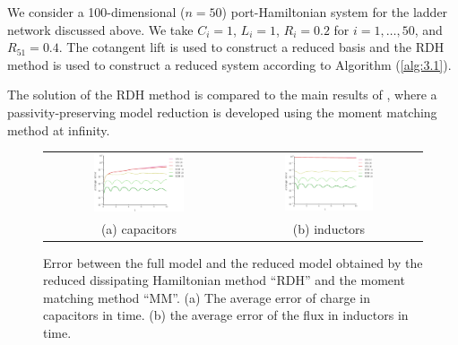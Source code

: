 We consider a 100-dimensional ($n=50$) port-Hamiltonian system for the ladder network discussed above. We take $C_i=1$, $L_i = 1$, $R_i=0.2$ for $i=1,\dots,50$, and $R_{51} = 0.4$. The cotangent lift is used to construct a reduced basis and the RDH method is used to construct a reduced system according to Algorithm (\ref{alg:3.1}). 

The solution of the RDH method is compared to the main results of \cite{Polyuga:2010gj}, where a passivity-preserving model reduction is developed using the moment matching method at infinity.

\begin{figure}[t]
\begin{tabular}{cc}
\includegraphics[width=0.5\textwidth]{./figs/porthamil/error_capac} & 
\includegraphics[width=0.5\textwidth]{./figs/porthamil/error_flux} \\
(a) capacitors & (b) inductors
\end{tabular}
\caption{Error between the full model and the reduced model obtained by the reduced dissipating Hamiltonian method ``RDH'' and the moment matching method ``MM''. (a) The average error of charge in capacitors in time. (b) the average error of the flux in inductors in time.} \label{fig:4.3}
\end{figure}
